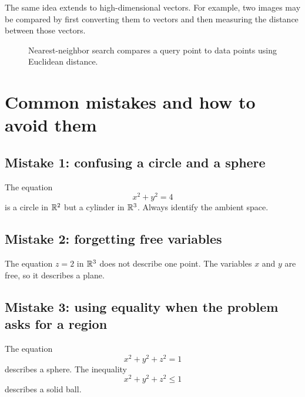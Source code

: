The same idea extends to high-dimensional vectors. For example, two images may be compared by first converting them to vectors and then measuring the distance between those vectors.

\begin{figure}[H]
\centering
{}
\caption{Nearest-neighbor search compares a query point to data points using Euclidean distance.}
\label{fig:nearest-neighbor}
\end{figure}

\section{Common mistakes and how to avoid them}

\subsection*{Mistake 1: confusing a circle and a sphere}

The equation
\[
  x^2+y^2=4
\]
is a circle in $\mathbb{R}^2$ but a cylinder in $\mathbb{R}^3$. Always identify the ambient space.

\subsection*{Mistake 2: forgetting free variables}

The equation $z=2$ in $\mathbb{R}^3$ does not describe one point. The variables $x$ and $y$ are free, so it describes a plane.

\subsection*{Mistake 3: using equality when the problem asks for a region}

The equation
\[
  x^2+y^2+z^2=1
\]
describes a sphere. The inequality
\[
  x^2+y^2+z^2\le 1
\]
describes a solid ball.

